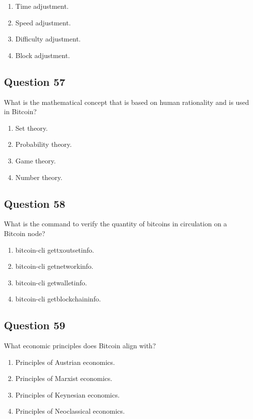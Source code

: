 \documentclass[12pt,a4paper]{article}
\begin{document}
\begin{enumerate}[label=\Alph*., leftmargin=*]
\item Time adjustment.
\item Speed adjustment.
\item Difficulty adjustment.
\item Block adjustment.
\end{enumerate}

\bigskip


\subsection*{Question 57}
What is the mathematical concept that is based on human rationality and is used in Bitcoin?

\begin{enumerate}[label=\Alph*., leftmargin=*]
\item Set theory.
\item Probability theory.
\item Game theory.
\item Number theory.
\end{enumerate}

\bigskip


\subsection*{Question 58}
What is the command to verify the quantity of bitcoins in circulation on a Bitcoin node?

\begin{enumerate}[label=\Alph*., leftmargin=*]
\item bitcoin-cli gettxoutsetinfo.
\item bitcoin-cli getnetworkinfo.
\item bitcoin-cli getwalletinfo.
\item bitcoin-cli getblockchaininfo.
\end{enumerate}

\bigskip


\subsection*{Question 59}
What economic principles does Bitcoin align with?

\begin{enumerate}[label=\Alph*., leftmargin=*]
\item Principles of Austrian economics.
\item Principles of Marxist economics.
\item Principles of Keynesian economics.
\item Principles of Neoclassical economics.
\end{enumerate}
\end{document}
